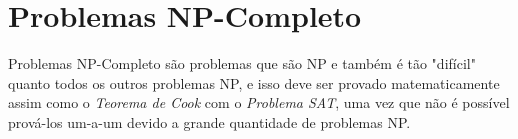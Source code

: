 \section{Problemas NP-Completo}
Problemas NP-Completo são problemas que são NP e também é tão "difícil" quanto todos os outros problemas NP, e isso deve ser provado matematicamente assim como o \textit{Teorema de Cook} com o \textit{Problema SAT}, uma vez que não é possível prová-los um-a-um devido a grande quantidade de problemas NP.

